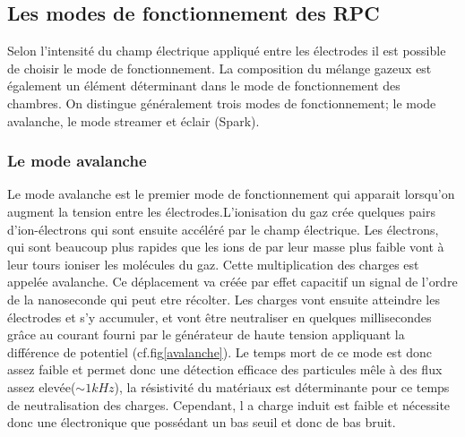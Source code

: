 \subsection{Les modes de fonctionnement des RPC}
Selon l'intensité du champ électrique appliqué  entre les électrodes il est possible de choisir le mode de fonctionnement. La composition du mélange gazeux est également un élément déterminant dans le mode de fonctionnement des chambres. On distingue généralement trois modes de fonctionnement; le mode avalanche, le mode streamer et éclair (Spark).

\subsubsection{Le mode avalanche}
Le mode avalanche est le premier mode de fonctionnement qui apparait lorsqu'on augment la tension entre les électrodes.L'ionisation du gaz crée quelques pairs d'ion-électrons qui sont ensuite accéléré par le champ électrique. Les électrons, qui sont beaucoup plus rapides que les ions de par leur masse plus faible vont à leur tours ioniser les molécules du gaz. Cette multiplication des charges est appelée avalanche. Ce déplacement va créée par effet capacitif un signal de l'ordre de la nanoseconde qui peut etre récolter. Les charges vont ensuite atteindre les électrodes et s'y accumuler, et vont être neutraliser en quelques millisecondes grâce au courant fourni par le générateur de haute tension appliquant la différence de potentiel (cf.fig\ref{avalanche}). Le temps mort de ce mode est donc assez faible et permet donc une détection efficace des particules mêle à des flux assez elevée($\sim1kHz$), la résistivité du matériaux est déterminante pour ce temps de neutralisation des charges. Cependant, l a charge induit est faible et nécessite donc une électronique que possédant un bas seuil et donc de bas bruit.



